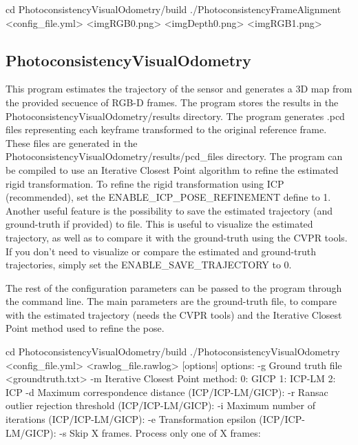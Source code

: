 \begin{DoxyVerb}
cd PhotoconsistencyVisualOdometry/build
./PhotoconsistencyFrameAlignment <config_file.yml> <imgRGB0.png> <imgDepth0.png> <imgRGB1.png>
\end{DoxyVerb}


 \hypertarget{index_PhotoconsistencyVisualOdometry}{}\subsection{PhotoconsistencyVisualOdometry}\label{index_PhotoconsistencyVisualOdometry}
This program estimates the trajectory of the sensor and generates a 3D map from the provided secuence of RGB-\/D frames. The program stores the results in the PhotoconsistencyVisualOdometry/results directory. The program generates .pcd files representing each keyframe transformed to the original reference frame. These files are generated in the PhotoconsistencyVisualOdometry/results/pcd\_\-files directory. The program can be compiled to use an Iterative Closest Point algorithm to refine the estimated rigid transformation. To refine the rigid transformation using ICP (recommended), set the ENABLE\_\-ICP\_\-POSE\_\-REFINEMENT define to 1. Another useful feature is the possibility to save the estimated trajectory (and ground-\/truth if provided) to file. This is useful to visualize the estimated trajectory, as well as to compare it with the ground-\/truth using the CVPR tools. If you don't need to visualize or compare the estimated and ground-\/truth trajectories, simply set the ENABLE\_\-SAVE\_\-TRAJECTORY to 0.

The rest of the configuration parameters can be passed to the program through the command line. The main parameters are the ground-\/truth file, to compare with the estimated trajectory (needs the CVPR tools) and the Iterative Closest Point method used to refine the pose.

\begin{DoxyVerb}
cd PhotoconsistencyVisualOdometry/build
./PhotoconsistencyVisualOdometry <config_file.yml> <rawlog_file.rawlog> [options]
       options: 
               -g          Ground truth file <groundtruth.txt>
               -m          Iterative Closest Point method:
                           0: GICP
                           1: ICP-LM
                           2: ICP
               -d          Maximum correspondence distance (ICP/ICP-LM/GICP):
               -r          Ransac outlier rejection threshold (ICP/ICP-LM/GICP):
               -i          Maximum number of iterations (ICP/ICP-LM/GICP):
               -e          Transformation epsilon (ICP/ICP-LM/GICP):
               -s          Skip X frames. Process only one of X frames:
\end{DoxyVerb}


